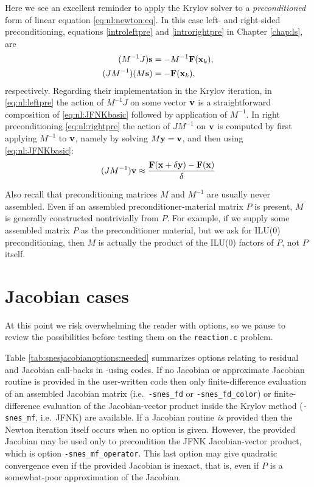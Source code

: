 Here we see an excellent reminder to apply the Krylov solver to a \emph{preconditioned} form of linear equation \eqref{eq:nl:newton:eq}.  In this case left- and right-sided preconditioning, equations \eqref{introleftpre} and \eqref{introrightpre} in Chapter \ref{chap:ls}, are
\begin{align}
(M^{-1} J) \mathbf{s} &= - M^{-1} \mathbf{F}(\mathbf{x}_k), \label{eq:nl:leftpre} \\
(J M^{-1}) (M \mathbf{s}) &= - \mathbf{F}(\mathbf{x}_k), \label{eq:nl:rightpre}
\end{align}
respectively.  Regarding their implementation in the Krylov iteration, in \eqref{eq:nl:leftpre} the action of $M^{-1} J$ on some vector $\mathbf{v}$ is a straightforward composition of \eqref{eq:nl:JFNKbasic} followed by application of $M^{-1}$.  In right preconditioning \eqref{eq:nl:rightpre} the action of $J M^{-1}$ on $\mathbf{v}$ is computed by first applying $M^{-1}$ to $\mathbf{v}$, namely by solving $M \mathbf{y} = \mathbf{v}$, and then using \eqref{eq:nl:JFNKbasic}:
\begin{equation}
(J M^{-1}) \mathbf{v} \approx \frac{\mathbf{F}(\mathbf{x}+\delta \mathbf{y}) - \mathbf{F}(\mathbf{x})}{\delta} \label{eq:nl:JFNKwithrightpre}
\end{equation}

Also recall that preconditioning matrices $M$ and $M^{-1}$ are usually never assembled.  Even if an assembled preconditioner-material matrix $P$ is present, $M$ is generally constructed nontrivially from $P$.  For example, if we supply some assembled matrix $P$ as the preconditioner material, but we ask for ILU($0$) preconditioning, then $M$ is actually the product of the ILU($0$) factors of $P$, not $P$ itself.


\section{Jacobian cases} \label{sec:jacobiancases}

\def\checkmark{\tikz\fill[scale=0.4](0,.35) -- (.25,0) -- (.7,.8) -- (.25,.15) -- cycle;}
\def\bigcheckmark{\tikz\fill[scale=0.6](0,.35) -- (.25,0) -- (.7,.8) -- (.25,.15) -- cycle;}

At this point we risk overwhelming the reader with options, so we pause to review the possibilities before testing them on the \texttt{reaction.c} problem.

Table \ref{tab:snesjacobianoptions:needed} summarizes options relating to residual and Jacobian call-backs in \pSNES-using codes.  If no Jacobian or approximate Jacobian routine is provided in the user-written code then only finite-difference evaluation of an assembled Jacobian matrix (i.e.~\texttt{-snes\_fd} or \texttt{-snes\_fd\_color}) or finite-difference evaluation of the Jacobian-vector product inside the Krylov method (\texttt{-snes\_mf}, i.e.~JFNK) are available.  If a Jacobian routine \emph{is} provided then the Newton iteration itself occurs when no option is given.  However, the provided Jacobian may be used only to precondition the JFNK Jacobian-vector product, which is option \texttt{-snes\_mf\_operator}.  This last option may give quadratic convergence even if the provided Jacobian is inexact, that is, even if $P$ is a somewhat-poor approximation of the Jacobian.

